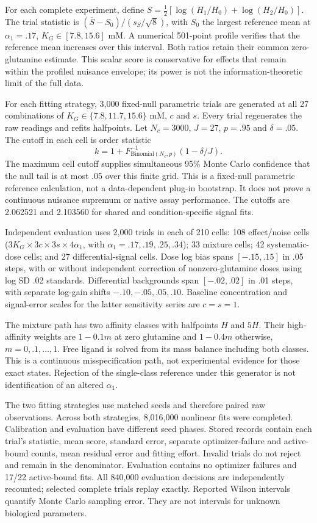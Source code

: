 \documentclass[11pt]{article}
\begin{document}
For each complete experiment, define $S=\tfrac12[\log(H_1/H_0)+\log(H_2/H_0)]$. The trial statistic is $(\overline S-S_0)/(s_S/\sqrt8)$, with $S_0$ the largest reference mean at $\alpha_1=.17$, $K_G\in[7.8,15.6]$ mM. A numerical 501-point profile verifies that the reference mean increases over this interval. Both ratios retain their common zero-glutamine estimate. This scalar score is conservative for effects that remain within the profiled nuisance envelope; its power is not the information-theoretic limit of the full data.

For each fitting strategy, 3,000 fixed-null parametric trials are generated at all 27 combinations of $K_G\in\{7.8,11.7,15.6\}$ mM, $c$ and $s$. Every trial regenerates the raw readings and refits halfpoints. Let $N_c=3000$, $J=27$, $p=.95$ and $\delta=.05$. The cutoff in each cell is order statistic
\begin{equation}
 k=1+F_{\mathrm{Binomial}(N_c,p)}^{-1}(1-\delta/J).
\end{equation}
The maximum cell cutoff supplies simultaneous 95\% Monte Carlo confidence that the null tail is at most .05 over this finite grid. This is a fixed-null parametric reference calculation, not a data-dependent plug-in bootstrap. It does not prove a continuous nuisance supremum or native assay performance. The cutoffs are 2.062521 and 2.103560 for shared and condition-specific signal fits.

Independent evaluation uses 2,000 trials in each of 210 cells: 108 effect/noise cells ($3K_G\times3c\times3s\times4\alpha_1$, with $\alpha_1=.17,.19,.25,.34$); 33 mixture cells; 42 systematic-dose cells; and 27 differential-signal cells. Dose log bias spans $[-.15,.15]$ in .05 steps, with or without independent correction of nonzero-glutamine doses using log SD .02 standards. Differential backgrounds span $[-.02,.02]$ in .01 steps, with separate log-gain shifts $-.10,-.05,.05,.10$. Baseline concentration and signal-error scales for the latter sensitivity series are $c=s=1$.

The mixture path has two affinity classes with halfpoints $H$ and $5H$. Their high-affinity weights are $1-0.1m$ at zero glutamine and $1-0.4m$ otherwise, $m=0,.1,\ldots,1$. Free ligand is solved from its mass balance including both classes. This is a continuous misspecification path, not experimental evidence for those exact states. Rejection of the single-class reference under this generator is not identification of an altered $\alpha_1$.

The two fitting strategies use matched seeds and therefore paired raw observations. Across both strategies, 8,016,000 nonlinear fits were completed. Calibration and evaluation have different seed phases. Stored records contain each trial's statistic, mean score, standard error, separate optimizer-failure and active-bound counts, mean residual error and fitting effort. Invalid trials do not reject and remain in the denominator. Evaluation contains no optimizer failures and 17/22 active-bound fits. All 840,000 evaluation decisions are independently recounted; selected complete trials replay exactly. Reported Wilson intervals quantify Monte Carlo sampling error. They are not intervals for unknown biological parameters.
\end{document}
